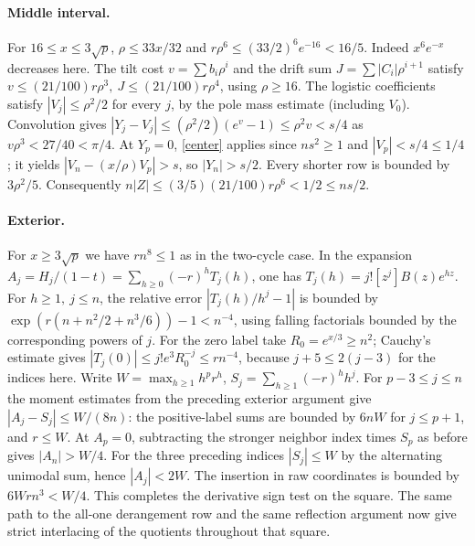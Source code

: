 \paragraph{Middle interval.}
For \(16\le x\le3\sqrt p\), \(\rho\le33x/32\) and \(r\rho^6\le(33/2)^6e^{-16}<16/5\). Indeed \(x^6 e^{-x}\) decreases here. The tilt cost \(v=\sum b_i\rho^i\) and the drift sum \(J=\sum |C_i|\rho^{i+1}\) satisfy \(v\le(21/100)r\rho^3,\ J\le(21/100)r\rho^4\), using \(\rho\ge16\). The logistic coefficients satisfy \(|V_j|\le\rho^2/2\) for every \(j\), by the pole mass estimate (including \(V_0\)). Convolution gives \(|Y_j-V_j|\le(\rho^2/2)(e^v-1)\le\rho^2v<s/4\) as \(v\rho^3<27/40<\pi/4\). At \(Y_p=0\), \eqref{center} applies since \(ns^2\ge1\) and \(|V_p|<s/4\le1/4\); it yields \(|V_n-(x/\rho)V_p|>s\), so \(|Y_n|>s/2\). Every shorter row is bounded by \(3\rho^2/5\). Consequently \(n|Z|\le(3/5)(21/100)r\rho^6<1/2\le ns/2\).

\paragraph{Exterior.}
For \(x\ge3\sqrt p\) we have \(r n^8\le1\) as in the two-cycle case. In the expansion \(A_j=H_j/(1-t)=\sum_{h\ge0}(-r)^h T_j(h)\), one has \(T_j(h)=j![z^j]B(z)e^{hz}\). For \(h\ge1,\ j\le n\), the relative error \(|T_j(h)/h^j-1|\) is bounded by \(\exp(r(n+n^2/2+n^3/6))-1<n^{-4}\), using falling factorials bounded by the corresponding powers of \(j\). For the zero label take \(R_0=e^{x/3}\ge n^2\); Cauchy's estimate gives \(|T_j(0)|\le j!e^3 R_0^{-j}\le r n^{-4}\), because \(j+5\le2(j-3)\) for the indices here. Write \(W=\max_{h\ge1}h^p r^h\), \(S_j=\sum_{h\ge1}(-r)^h h^j\).
For \(p-3\le j\le n\) the moment estimates from the preceding exterior argument give \(|A_j-S_j|\le W/(8n)\): the positive-label sums are bounded by \(6nW\) for \(j\le p+1\), and \(r\le W\). At \(A_p=0\), subtracting the stronger neighbor index times \(S_p\) as before gives \(|A_n|>W/4\). For the three preceding indices \(|S_j|\le W\) by the alternating unimodal sum, hence \(|A_j|<2W\). The insertion in raw coordinates is bounded by \(6W r n^3<W/4\). This completes the derivative sign test on the square. The same path to the all-one derangement row and the same reflection argument now give strict interlacing of the quotients throughout that square.

